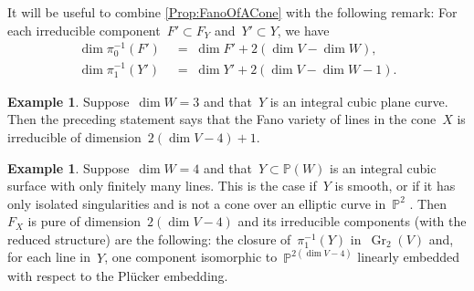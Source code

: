 \documentclass[a4paper]{amsart}
\newcommand{\bbP}{\mathbb{P}}
\DeclareMathOperator{\Gr}{Gr}
\theoremstyle{plain}
\theoremstyle{definition}
\newtheorem{example}[theorem]{Example}
\numberwithin{equation}{section}
\begin{document}
It will be useful to combine \cref{Prop:FanoOfACone} with the following remark: For each irreducible component~$F' \subset F_Y$ and~$Y' \subset Y$, we have
\begin{align*}
\dim \pi_0^{-1}(F') \; &= \; \dim F' + 2(\dim V - \dim W),\\
 \dim \pi_1^{-1}(Y') \; &= \; \dim Y' + 2(\dim V - \dim W - 1).
\end{align*}


\begin{example} \label{Ex:ConesOverEllipticCurves} Suppose~$\dim W = 3$ and that~$Y$ is an integral cubic plane curve. Then the preceding statement says that the Fano variety of lines in the cone~$X$ is irreducible of dimension~$2(\dim V -4)+1$.
\end{example}



\begin{example} \label{Ex:ConesOverCubicSurfacesWithFinitelyManyLines} Suppose~$\dim W = 4$ and that~$Y \subset \bbP(W)$ is an integral cubic surface with only finitely many lines. This is the case if~$Y$ is smooth, or if it has only isolated singularities and is not a cone over an elliptic curve in~$\bbP^2$ \cite{BruceWall, Sakamaki}. Then~$F_X$ is pure of dimension~$2(\dim V - 4)$ and its irreducible components (with the reduced structure) are the following: the closure of~$\pi_1^{-1}(Y)$ in~$\Gr_2(V)$ and, for each line in~$Y$, one component isomorphic to~$\bbP^{2(\dim V - 4)}$ linearly embedded with respect to the Pl\"ucker embedding.
\end{example}
\end{document}
